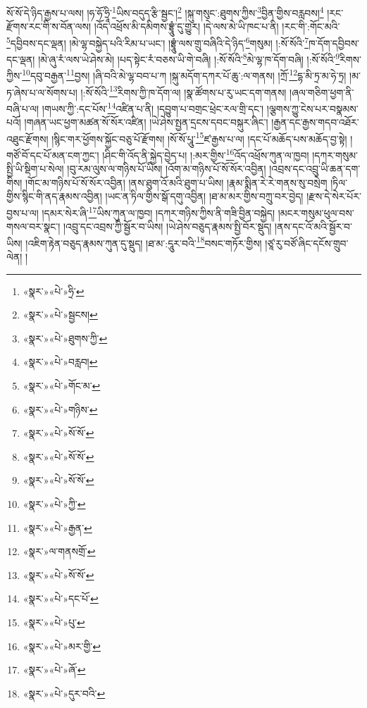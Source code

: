 སོ་སོ་དེ་ཉིད་རྒྱས་པ་ལས། །ཧ་ཧོ་ཧྲཱི་\footnote{«སྣར་»«པེ་»ཧྲི་}ཡིས་བདུད་རྩི་སྦྱང་།\footnote{«སྣར་»«པེ་»སྦྱངས།} །སྐུ་གསུང་:ཐུགས་ཀྱིས་\footnote{«སྣར་»«པེ་»ཐུགས་ཀྱི་}བྱིན་གྱིས་བརླབས།\footnote{«སྣར་»«པེ་»བརླབ།} །རང་རྫོགས་རང་གི་ས་བོན་ལས། །འོད་འཕྲོས་མི་དམིགས་བྷྲཱུཾ་དུ་གྱུར། །དེ་ལས་མེ་ཡི་ཁང་པ་ནི། །རང་གི་:གོང་མའི་\footnote{«སྣར་»«པེ་»གོང་མ་}དབྱིབས་དང་ལྡན། །མེ་ལྷ་བསྐྱེད་པའི་རིམ་པ་ཡང་། །བྷྲཱུཾ་ལས་གྲུ་བཞིའི་དེ་ཉིད་\footnote{«སྣར་»«པེ་»གཉིས་}གསུམ། །:སོ་སོའི་\footnote{«སྣར་»«པེ་»སོ་སོ་}ཁ་དོག་དབྱིབས་དང་ལྡན། །མེ་ཞུ་རཾ་ལས་ཡེ་ཤེས་མེ། །པད་སྟེང་རཾ་བཅས་ཡི་གེ་བཞི། །:སོ་སོའི་\footnote{«སྣར་»«པེ་»སོ་སོ་}མེ་ལྷ་ཁ་དོག་བཞི། །:སོ་སོའི་\footnote{«སྣར་»«པེ་»སོ་སོ་}རིགས་ཀྱིས་\footnote{«སྣར་»«པེ་»ཀྱི་}དབུ་བརྒྱན་\footnote{«སྣར་»«པེ་»རྒྱན་}བྱས། །ཞི་བའི་མེ་ལྷ་བབ་པ་ཀ །སྐུ་མདོག་དཀར་པོ་ཆུ་:ལ་གནས། །ཀྲོ་\footnote{«སྣར་»ལ་གནསགྲོ་}དྷ་མི་ཏྲ་མ་ཧེ་ཏྲ། །མ་ཏ་ཞེས་པ་ལ་སོགས་པ། །:སོ་སོའི་\footnote{«སྣར་»«པེ་»སོ་སོ་}རིགས་ཀྱི་ཁ་དོག་ལ། །སྣ་ཚོགས་པ་རུ་ཡང་དག་གནས། །ཞལ་གཅིག་ཕྱག་ནི་བཞི་པ་ལ། །གཡས་ཀྱི་:དང་པོས་\footnote{«སྣར་»«པེ་»དང་པོ་}འཛིན་པ་ནི། །དབྱུག་པ་བགྲང་ཕྲེང་རལ་གྲི་དང་། །ལྕགས་ཀྱུ་ངེས་པར་བསྣམས་པའོ། །གཞན་ཡང་ཕྱག་མཚན་སོ་སོར་འཛིན། །ཡེ་ཤེས་སྤྱན་དྲངས་དབང་བསྐུར་ཞིང་། །རྒྱན་དང་རྒྱས་གདབ་འཐོར་འཐུང་རྫོགས། །སྙིང་གར་ཕྱོགས་སྐྱོང་བཅུ་པོ་རྫོགས། །སོ་སོ་པཱུ་\footnote{«སྣར་»«པེ་»པུ་}ཛ་རྒྱས་པ་ལ། །དང་པོ་མཆོད་པས་མཆོད་བྱ་སྟེ། །གཙོ་བོ་དང་པོ་མན་ངག་ཀྱང་། །ཤིང་གི་འོད་ནི་སྐྱེད་བྱེད་པ། །:མར་གྱིས་\footnote{«སྣར་»«པེ་»མར་གྱི་}འོད་འཕྲོས་ཀུན་ལ་ཁྱབ། །དཀར་གསུམ་སྤྱི་ཡི་སྡིག་པ་སེལ། །བུ་རམ་ལུས་ལ་གཉིས་པོ་ཡིས། །འོག་མ་གཉིས་པོ་སོ་སོར་འབྱིན། །འབྲས་དང་འབྲུ་ཡི་ཆན་དག་གིས། །གོང་མ་གཉིས་པོ་སོ་སོར་འབྱིན། །ནས་ཐུག་འོ་མའི་ཐུག་པ་ཡིས། །རྣམ་སྨིན་རེ་རེ་གནས་སུ་བསྲེག །ཏིལ་གྱིས་སྙིང་གི་ནད་རྣམས་འབྱིན། །ཡང་ན་ཏིལ་གྱིས་སྒོ་དགུ་འབྱིན། །ཐ་མ་མར་གྱིས་བཀྲུ་བར་བྱེད། །རྫས་དེ་སེར་པོར་བྱས་པ་ལ། །དམར་སེར་ཞི་\footnote{«སྣར་»«པེ་»ཞོ་}ཡིས་ཀུན་ལ་ཁྱབ། །དཀར་གཉིས་ཀྱིས་ནི་གཟི་བྱིན་བསྐྱེད། །མངར་གསུམ་ཕུལ་བས་གསལ་བར་སྣང་། །འབྲུ་དང་འབྲས་ཀྱི་སྦྱོར་བ་ཡིས། །ཡེ་ཤེས་བཅུད་རྣམས་སྤྱི་བོར་སྡུད། །ནས་དང་འོ་མའི་སྦྱོར་བ་ཡིས། །འཇིག་རྟེན་བཅུད་རྣམས་ཀུན་དུ་སྡུད། །ཐ་མ་:དཱུར་བའི་\footnote{«སྣར་»«པེ་»དུར་བའི་}བསང་གཏོར་གྱིས། །ཙཱ་རུ་བཙོ་ཞིང་དངོས་གྲུབ་ལེན། །
